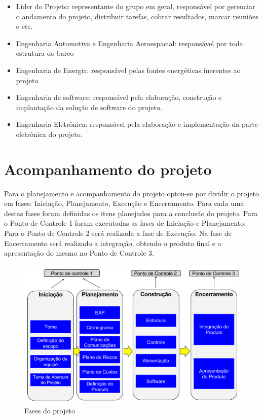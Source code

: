 \begin{itemize}
    \item Líder do Projeto: representante do grupo em geral, responsável por gerenciar o andamento do projeto, distribuir tarefas, cobrar resultados, marcar reuniões e etc.
    
    \item Engenharia Automotiva e Engenharia Aeroespacial: responsável por toda estrutura do barco
    
    \item Engenharia de Energia: responsável pelas fontes energéticas inerentes ao projeto
    
    \item Engenharia de software: responsável pela elaboração, construção e implantação da solução de software do projeto.
    
    \item Engenharia Eletrônica: responsável pela elaboração e implementação da parte eletrônica do projeto.
\end{itemize}

\section{Acompanhamento do projeto}

Para o planejamento e acompanhamento do projeto optou-se por dividir o projeto em fases: Iniciação, Planejamento, Execução e Encerramento. Para cada uma destas fases foram definidas os itens planejados para a conclusão do projeto. Para o Ponto de Controle 1 foram executadas as fases de Iniciação e Planejamento. Para o Ponto de Controle 2 será realizada a fase de Execução. Na fase de Encerramento será realizado a integração, obtendo o produto final e a apresentação do mesmo no Ponto de Controle 3.


 \begin{figure} [!htp]
	\centering
	\includegraphics[scale=0.55]{figuras/fases}
	\caption{Fases do projeto}
	\label{EAP}
\end{figure}



